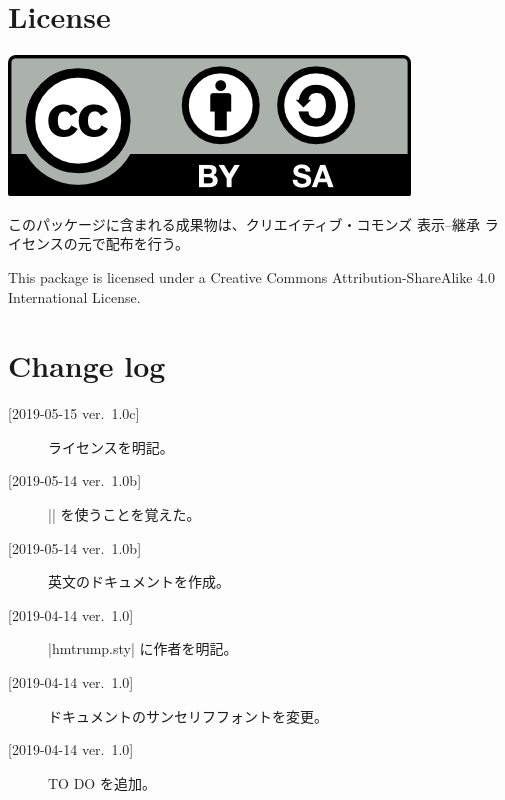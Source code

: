\documentclass{jlreq}
\begin{document}
\section{License}

\rule{0pt}{0pt}\hfill\includegraphics[height=2\zh]{by-sa.png}\hfill\rule{0pt}{0pt}

このパッケージに含まれる成果物は、クリエイティブ・コモンズ 表示--継承
ライセンスの元で配布を行う。

This package is licensed under a Creative Commons Attribution-ShareAlike
4.0 International License.

\section{Change log}
\begin{description}
\item[{[2019-05-15 ver.~1.0c]}] ライセンスを明記。
\item[{[2019-05-14 ver.~1.0b]}] |\@undefined| を使うことを覚えた。
\item[{[2019-05-14 ver.~1.0b]}] 英文のドキュメントを作成。
\item[{[2019-04-14 ver.~1.0]}] |hmtrump.sty| に作者を明記。
\item[{[2019-04-14 ver.~1.0]}] ドキュメントのサンセリフフォントを変更。
\item[{[2019-04-14 ver.~1.0]}] TO DO を追加。
\end{description}
\end{document}
